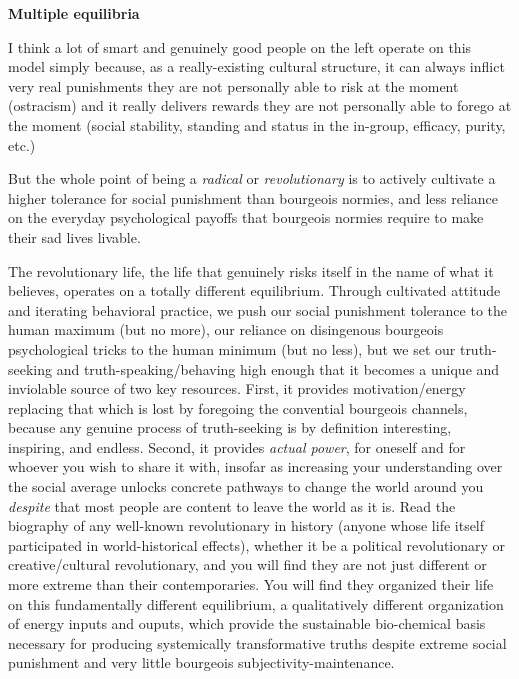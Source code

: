 \documentclass[a4paper,12pt,margin=.5in]{article}
\begin{document}
\textbf{Multiple equilibria}

I think a lot of smart and genuinely good people on the left operate on
this model simply because, as a really-existing cultural structure, it
can always inflict very real punishments they are not personally able to
risk at the moment (ostracism) and it really delivers rewards they are
not personally able to forego at the moment (social stability, standing
and status in the in-group, efficacy, purity, etc.)

But the whole point of being a \emph{radical} or \emph{revolutionary} is
to actively cultivate a higher tolerance for social punishment than
bourgeois normies, and less reliance on the everyday psychological
payoffs that bourgeois normies require to make their sad lives livable.

The revolutionary life, the life that genuinely risks itself in the name
of what it believes, operates on a totally different equilibrium.
Through cultivated attitude and iterating behavioral practice, we push
our social punishment tolerance to the human maximum (but no more), our
reliance on disingenous bourgeois psychological tricks to the human
minimum (but no less), but we set our truth-seeking and
truth-speaking/behaving high enough that it becomes a unique and
inviolable source of two key resources. First, it provides
motivation/energy replacing that which is lost by foregoing the
convential bourgeois channels, because any genuine process of
truth-seeking is by definition interesting, inspiring, and endless.
Second, it provides \emph{actual power}, for oneself and for whoever you
wish to share it with, insofar as increasing your understanding over the
social average unlocks concrete pathways to change the world around you
\emph{despite} that most people are content to leave the world as it is.
Read the biography of any well-known revolutionary in history (anyone
whose life itself participated in world-historical effects), whether it
be a political revolutionary or creative/cultural revolutionary, and you
will find they are not just different or more extreme than their
contemporaries. You will find they organized their life on this
fundamentally different equilibrium, a qualitatively different
organization of energy inputs and ouputs, which provide the sustainable
bio-chemical basis necessary for producing systemically transformative
truths despite extreme social punishment and very little bourgeois
subjectivity-maintenance.
\end{document}
